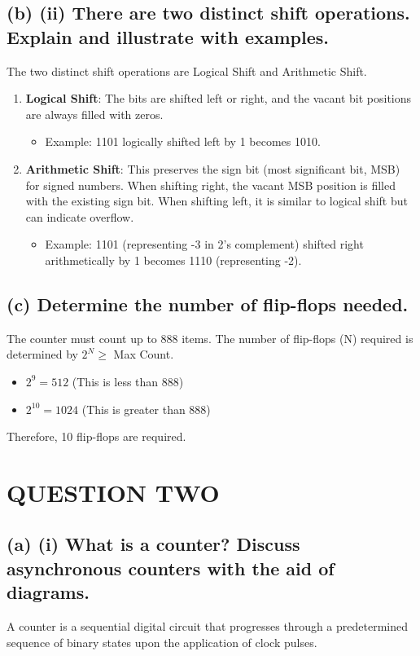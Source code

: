 \documentclass[11pt,a4paper]{article}
\begin{document}
\subsection*{(b) (ii) There are two distinct shift operations. Explain and illustrate with examples.}
The two distinct shift operations are Logical Shift and Arithmetic Shift.

\begin{enumerate}
    \item \textbf{Logical Shift}: The bits are shifted left or right, and the vacant bit positions are always filled with zeros.
       \begin{itemize}
           \item Example: 1101 logically shifted left by 1 becomes 1010.
       \end{itemize}
    \item \textbf{Arithmetic Shift}: This preserves the sign bit (most significant bit, MSB) for signed numbers. When shifting right, the vacant MSB position is filled with the existing sign bit. When shifting left, it is similar to logical shift but can indicate overflow.
       \begin{itemize}
           \item Example: 1101 (representing -3 in 2's complement) shifted right arithmetically by 1 becomes 1110 (representing -2).
       \end{itemize}
\end{enumerate}

\subsection*{(c) Determine the number of flip-flops needed.}
The counter must count up to 888 items. The number of flip-flops (N) required is determined by $2^N \geq$ Max Count.

\begin{itemize}
    \item $2^9 = 512$ (This is less than 888)
    \item $2^{10} = 1024$ (This is greater than 888)
\end{itemize}
Therefore, 10 flip-flops are required.

\section*{QUESTION TWO}

\subsection*{(a) (i) What is a counter? Discuss asynchronous counters with the aid of diagrams.}
A counter is a sequential digital circuit that progresses through a predetermined sequence of binary states upon the application of clock pulses. 
\end{document}

